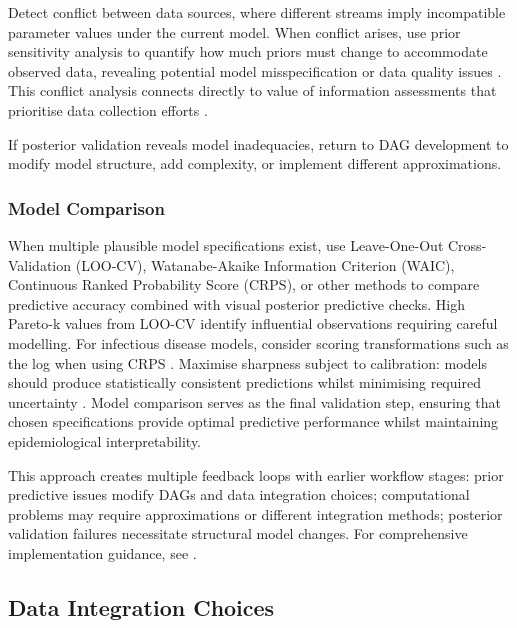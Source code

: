 \documentclass{article}
\begin{document}
Detect conflict between data sources, where different streams imply incompatible parameter values under the current model.
When conflict arises, use prior sensitivity analysis to quantify how much priors must change to accommodate observed data, revealing potential model misspecification or data quality issues \citep{roos2015sensitivity,nott2021approximation,kallioinen2021detecting}.
This conflict analysis connects directly to value of information assessments that prioritise data collection efforts \citep{jackson2019value}.

If posterior validation reveals model inadequacies, return to DAG development to modify model structure, add complexity, or implement different approximations.

\subsubsection{Model Comparison}

When multiple plausible model specifications exist, use Leave-One-Out Cross-Validation (LOO-CV), Watanabe-Akaike Information Criterion (WAIC), Continuous Ranked Probability Score (CRPS), or other methods to compare predictive accuracy \citep{vehtari2017practical,yao2018using,gneiting2007strictly} combined with visual posterior predictive checks.
High Pareto-k values from LOO-CV identify influential observations requiring careful modelling.
For infectious disease models, consider scoring transformations such as the log when using CRPS \citep{bosse2023scoring}.
Maximise sharpness subject to calibration: models should produce statistically consistent predictions whilst minimising required uncertainty \citep{gneiting2007strictly}.
Model comparison serves as the final validation step, ensuring that chosen specifications provide optimal predictive performance whilst maintaining epidemiological interpretability.

This approach creates multiple feedback loops with earlier workflow stages: prior predictive issues modify DAGs and data integration choices; computational problems may require approximations or different integration methods; posterior validation failures necessitate structural model changes.
For comprehensive implementation guidance, see \citep{gelman2020bayesian}.

\subsection{Data Integration Choices}\label{sec:integration}
\end{document}

